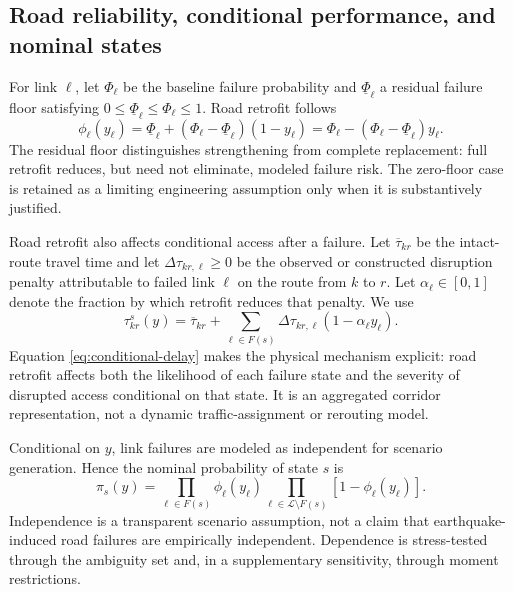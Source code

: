 \subsection{Road reliability, conditional performance, and nominal states}
\label{sec:road-model}

For link \(\ell\), let \(\Phi_\ell\) be the baseline failure probability and
\(\underline\Phi_\ell\) a residual failure floor satisfying
\(0\leq\underline\Phi_\ell\leq\Phi_\ell\leq1\). Road retrofit follows
\begin{equation}
 \phi_\ell(y_\ell)
   =\underline\Phi_\ell+
       \left(\Phi_\ell-\underline\Phi_\ell\right)(1-y_\ell)
   =\Phi_\ell-\left(\Phi_\ell-\underline\Phi_\ell\right)y_\ell.
\label{eq:residual-reliability}
\end{equation}
The residual floor distinguishes strengthening from complete replacement:
full retrofit reduces, but need not eliminate, modeled failure risk. The
zero-floor case is retained as a limiting engineering assumption only when
it is substantively justified.

Road retrofit also affects conditional access after a failure. Let
\(\overline\tau_{kr}\) be the intact-route travel time and let
\(\Delta\tau_{kr,\ell}\geq0\) be the observed or constructed disruption
penalty attributable to failed link \(\ell\) on the route from \(k\) to
\(r\). Let \(\alpha_\ell\in[0,1]\) denote the fraction by which retrofit
reduces that penalty. We use
\begin{equation}
 \tau_{kr}^s(y)
 =\overline\tau_{kr}+
   \sum_{\ell\in F(s)}
      \Delta\tau_{kr,\ell}(1-\alpha_\ell y_\ell).
\label{eq:conditional-delay}
\end{equation}
Equation \eqref{eq:conditional-delay} makes the physical mechanism explicit:
road retrofit affects both the likelihood of each failure state and the
severity of disrupted access conditional on that state. It is an aggregated
corridor representation, not a dynamic traffic-assignment or rerouting
model.

Conditional on \(y\), link failures are modeled as independent for scenario
generation. Hence the nominal probability of state \(s\) is
\begin{equation}
 \pi_s(y)=
   \prod_{\ell\in F(s)}\phi_\ell(y_\ell)
   \prod_{\ell\in\mathcal L\setminus F(s)}
       \left[1-\phi_\ell(y_\ell)\right].
\label{eq:nominal-probability}
\end{equation}
Independence is a transparent scenario assumption, not a claim that
earthquake-induced road failures are empirically independent. Dependence is
stress-tested through the ambiguity set and, in a supplementary sensitivity,
through moment restrictions.

